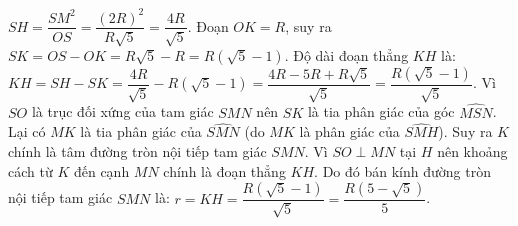 \begin{bt}
{\begin{enumerate}[a)]
    $SH = \dfrac{SM^2}{OS} = \dfrac{(2R)^2}{R\sqrt{5}} = \dfrac{4R}{\sqrt{5}}$.
    Đoạn $OK = R$, suy ra $SK = OS - OK = R\sqrt{5} - R = R(\sqrt{5} - 1)$.
    Độ dài đoạn thẳng $KH$ là:
    $KH = SH - SK = \dfrac{4R}{\sqrt{5}} - R(\sqrt{5} - 1) = \dfrac{4R - 5R + R\sqrt{5}}{\sqrt{5}} = \dfrac{R(\sqrt{5} - 1)}{\sqrt{5}}$.
    Vì $SO$ là trục đối xứng của tam giác $SMN$ nên $SK$ là tia phân giác của góc $\widehat{MSN}$.
    Lại có $MK$ là tia phân giác của $\widehat{SMN}$ (do $MK$ là phân giác của $\widehat{SMH}$).
    Suy ra $K$ chính là tâm đường tròn nội tiếp tam giác $SMN$.
    Vì $SO \perp MN$ tại $H$ nên khoảng cách từ $K$ đến cạnh $MN$ chính là đoạn thẳng $KH$.
    Do đó bán kính đường tròn nội tiếp tam giác $SMN$ là:
    $r = KH = \dfrac{R(\sqrt{5} - 1)}{\sqrt{5}} = \dfrac{R(5 - \sqrt{5})}{5}$.
\end{enumerate}
}
\end{bt}

